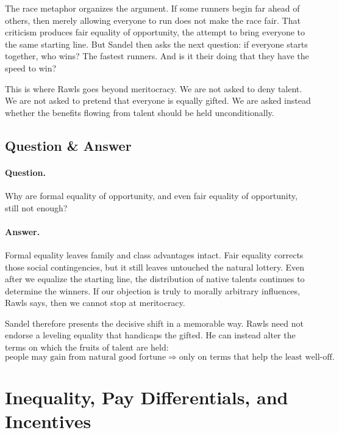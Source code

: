 The race metaphor organizes the argument. If some runners begin far ahead of others, then merely allowing everyone to run does not make the race fair. That criticism produces fair equality of opportunity, the attempt to bring everyone to the same starting line. But Sandel then asks the next question: if everyone starts together, who wins? The fastest runners. And is it their doing that they have the speed to win?

This is where Rawls goes beyond meritocracy. We are not asked to deny talent. We are not asked to pretend that everyone is equally gifted. We are asked instead whether the benefits flowing from talent should be held unconditionally.

\subsection{Question \& Answer}

\paragraph{Question.} Why are formal equality of opportunity, and even fair equality of opportunity, still not enough?

\paragraph{Answer.} Formal equality leaves family and class advantages intact. Fair equality corrects those social contingencies, but it still leaves untouched the natural lottery. Even after we equalize the starting line, the distribution of native talents continues to determine the winners. If our objection is truly to morally arbitrary influences, Rawls says, then we cannot stop at meritocracy.

Sandel therefore presents the decisive shift in a memorable way. Rawls need not endorse a leveling equality that handicaps the gifted. He can instead alter the terms on which the fruits of talent are held:
\begin{equation}
\text{people may gain from natural good fortune}
\Longrightarrow
\text{only on terms that help the least well-off}.
\end{equation}

\section{Inequality, Pay Differentials, and Incentives}

